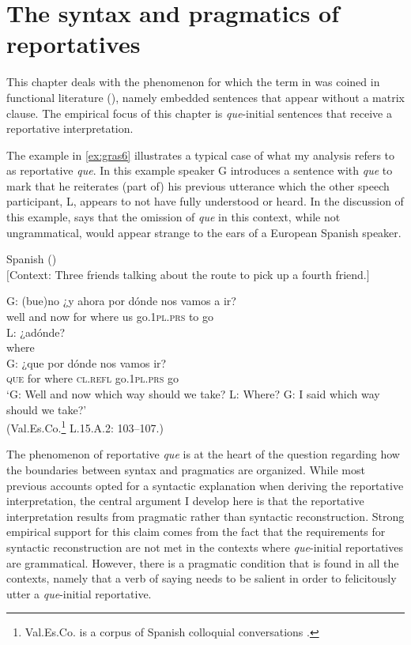 \judgewidth{\#}
\chapter{The syntax and pragmatics of reportatives}\label{sec:insubint}
This chapter deals with the phenomenon  for which the term in was coined in functional literature  (\citealt{Evans2007}), namely   embedded sentences that appear without a matrix clause. The  empirical focus of this chapter is \emph{que}-initial sentences that receive a  reportative interpretation. 

The example in \eqref{ex:gras6} illustrates a typical case of what my analysis refers to as reportative \emph{que}. In this example speaker G introduces a sentence with \emph{que} to mark that he reiterates (part of) his previous utterance which the other speech participant, L, appears to not have fully understood or heard. In the discussion of this example, \citet{Gras2016} says that the omission of \emph{que} in this context, while not ungrammatical, would appear strange to the ears of a European Spanish speaker.

\ea Spanish (\citealt[119: ex 6]{Gras2016}) \label{ex:gras6} \\
$[$Context: Three friends talking about the route to pick
up a fourth friend.$]$

\exi{}  \gll G: (bue)no ¿y ahora por dónde nos vamos a ir?
\\
 {} well and now for where us go.\textsc{1pl.prs} to go\\
\exi{}\gll  L: ¿adónde?
\\
{} where\\
\exi{} \gll G: ¿que por dónde nos vamos ir?
\\
{} \textsc{que} for where \textsc{cl.refl} go.\textsc{1pl.prs} go
\\
\glt `G: Well and now which way should we take? L: Where? G: I said which way should we take?'\\
(Val.Es.Co.\footnote{Val.Es.Co. is a corpus of Spanish colloquial conversations \citep{Briz2002}.} L.15.A.2: 103–107.)
\z 


The phenomenon of reportative \emph{que} is at the heart of the question regarding how the boundaries between syntax and pragmatics are organized. While most previous accounts opted  for a syntactic explanation when deriving the reportative interpretation,  the central argument I develop here is that the reportative interpretation results from pragmatic rather than syntactic reconstruction. Strong empirical support for this claim comes from the fact that the requirements for syntactic reconstruction are not met in the contexts where \emph{que}-initial reportatives are grammatical. However, there is a pragmatic condition that is found in all the contexts, namely that a verb of saying needs to be salient in order to felicitously utter a \emph{que}-initial reportative.

